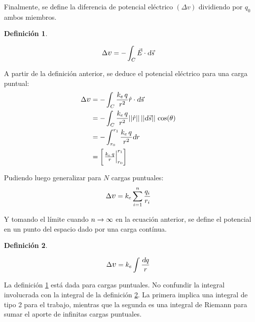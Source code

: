\documentclass[a5paper,12pt,twoside]{book}
\newtheorem{defn}{{Definición}}[chapter]
\begin{document}
Finalmente, se define la diferencia de potencial eléctrico $(\Delta v)$ dividiendo por $q_0$ ambos miembros.

\begin{mdframed}[style=MyFrame1]
    \begin{defn}
        \label{defn:potEle}
    \end{defn}
    \begin{equation*}
        \Delta \voltage = - \int_C \vec{E} \cdot \dif \vec{s}
    \end{equation*}
\end{mdframed}

A partir de la definición anterior, se deduce el potencial eléctrico para una carga puntual:
\begin{align*}
    \Delta \voltage &= - \int_C \frac{\cstcoulomb \, q}{r^2} \versor{r} \cdot \dif \Vec{s}
    \\
    &= - \int_C \frac{\cstcoulomb \, q}{r^2} \nnorm{\versor{r}} \, \nnorm{\dif \Vec{s}} \, \cos(\theta)
    \\
    &= - \int_{r_0}^{r_1} \frac{\cstcoulomb \, q}{r^2} \dif r
    \\
    &= \barrow{\frac{\cstcoulomb \, q}{r}}{r_0}{r_1}
\end{align*}

Pudiendo luego generalizar para $N$ cargas puntuales:
\begin{equation}
    \Delta \voltage = \cstcoulomb \sum_{\ith=1}^\nth \frac{q_\ith}{r_\ith}
\end{equation}

Y tomando el límite cuando $n\to\infty$ en la ecuación anterior, se define el potencial en un punto del espacio dado por una carga contínua.

\begin{mdframed}[style=MyFrame1]
    \begin{defn}
        \label{defn:potCargaCont}
    \end{defn}
    \begin{equation*}
        \Delta \voltage = \cstcoulomb \int \frac{\dif q}{r}
    \end{equation*}
\end{mdframed}

La definición \ref{defn:potEle} está dada para cargas puntuales.
No confundir la integral involucrada con la integral de la definición \ref{defn:potCargaCont}.
La primera implica una integral de tipo 2 para el trabajo, mientras que la segunda es una integral de Riemann para sumar el aporte de infinitas cargas puntuales.
\end{document}
